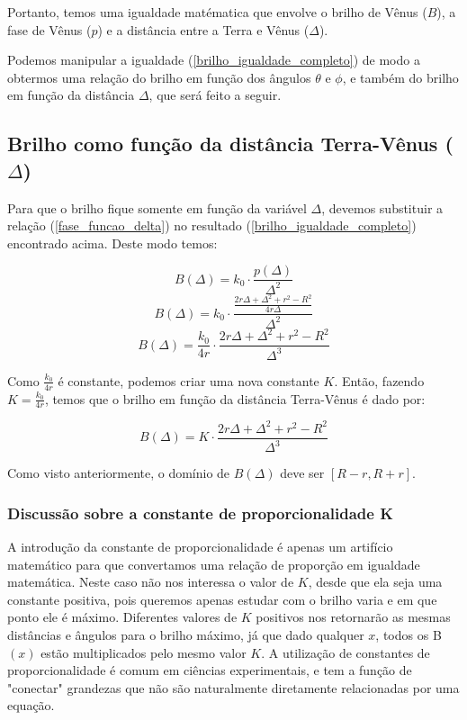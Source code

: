 \documentclass[a4paper, 12pt]{article}
\begin{document}
Portanto, temos uma igualdade matématica que envolve o brilho de Vênus ($B$), a fase de Vênus ($p$) e a distância entre a Terra e Vênus ($\Delta$). 

Podemos manipular a igualdade (\ref{brilho_igualdade_completo}) de modo a obtermos uma relação do brilho em função dos ângulos $\theta$ e $\phi$, e também do brilho em função da distância $\Delta$, que será feito a seguir.

\subsection{Brilho como função da distância Terra-Vênus ($\Delta$)}

Para que o brilho fique somente em função da variável $\Delta$, devemos substituir a relação (\ref{fase_funcao_delta}) no resultado (\ref{brilho_igualdade_completo}) encontrado acima. Deste modo temos:

$$B\left(\Delta \right)=k_0\cdot \frac{p\left(\Delta \right)}{\Delta ^2}$$
$$B\left(\Delta \right)=k_0\cdot \frac{\frac{2r\Delta +\Delta ^2+r^2-R^2}{4r\Delta }}{\Delta ^2}$$
$$B\left(\Delta \right)=\frac{k_0}{4r}\cdot \frac{2r\Delta +\Delta ^2+r^2-R^2}{\Delta ^3}$$

Como $\frac{k_0}{4r}$ é constante, podemos criar uma nova constante $K$. Então, fazendo $K=\frac{k_0}{4r}$, temos que o brilho em função da distância Terra-Vênus é dado por:

\begin{equation}\label{brilho_funcao_delta}
    \boxed{\ B\left(\Delta \right)=K\cdot \frac{2r\Delta +\Delta ^2+r^2-R^2}{\Delta ^3}\ }
\end{equation}

Como visto anteriormente, o domínio de $B\left(\Delta \right)$ deve ser $\left[R-r{,}R+r\right]$. 

\subsubsection{Discussão sobre a constante de proporcionalidade K}

A introdução da constante de proporcionalidade é apenas um artifício matemático para que convertamos uma relação de proporção em igualdade matemática. Neste caso não nos interessa o valor de $K$, desde que ela seja uma constante positiva, pois queremos apenas estudar com o brilho varia e em que ponto ele é máximo. Diferentes valores de $K$ positivos nos retornarão as mesmas distâncias e ângulos para o brilho máximo, já que dado qualquer $x$, todos os B$\left(x \right)$ estão multiplicados pelo mesmo valor $K$. A utilização de constantes de proporcionalidade é comum em ciências experimentais, e tem a função de "conectar" grandezas que não são naturalmente diretamente relacionadas por uma equação.
\end{document}
